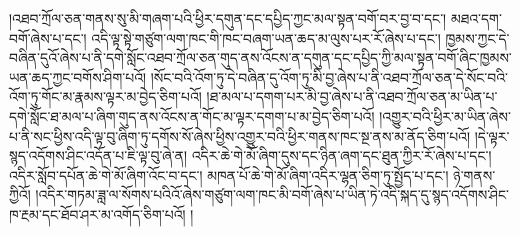 །འཐབ་ཀྲོལ་ཅན་གནས་སུ་མི་གཞག་པའི་ཕྱིར་དགུན་དང་དཔྱིད་ཀྱང་མལ་སྟན་བགོ་བར་བྱ་བ་དང་། མཐའ་དག་བགོ་ཞེས་པ་དང་། འདི་ལྟ་སྟེ་གཙུག་ལག་ཁང་གི་ཁང་བཞག་ཡན་ཆད་མ་ལུས་པར་རོ་ཞེས་པ་དང་། ཁྱམས་ཀྱང་དེ་བཞིན་དུའོ་ཞེས་པ་ནི་དགེ་སློང་འཐབ་ཀྲོལ་ཅན་གུད་ནས་འོངས་ན་དགུན་དང་དཔྱིད་ཀྱི་མལ་སྟན་བགོ་ཞིང་ཁྱམས་ཡན་ཆད་ཀྱང་བགོས་ཤིག་པའོ། །སོང་བའི་འོག་ཏུ་དེ་བཞིན་དུ་འོག་ཏུ་མི་བྱ་ཞེས་པ་ནི་འཐབ་ཀྲོལ་ཅན་དེ་སོང་བའི་འོག་ཏུ་གོང་མ་རྣམས་ལྟར་མ་བྱེད་ཅིག་པའོ། །ཐ་མལ་པ་དགག་པར་མི་བྱ་ཞེས་པ་ནི་འཐབ་ཀྲོལ་ཅན་མ་ཡིན་པ་དགེ་སློང་ཐ་མལ་པ་ཞིག་གུད་ནས་འོངས་ན་གོང་མ་ལྟར་དགག་པ་མ་བྱེད་ཅིག་པའོ། །འགྱུར་བའི་ཕྱིར་མ་ཡིན་ཞེས་པ་ནི་སང་ཕྱིས་འདི་ལྟ་བུ་ཞིག་ཏུ་དགོས་སོ་ཞེས་ཕྱིས་འགྱུར་བའི་ཕྱིར་གནས་ཁང་སྔ་ནས་མ་ནོད་ཅིག་པའོ། །དེ་ལྟར་སྙད་འདོགས་ཤིང་འདོན་པ་ཇི་ལྟ་བུ་ཞེ་ན། འདིར་ཆེ་གེ་མོ་ཞིག་དུས་དང་ཉིན་ཞག་དང་ཐུན་ཀྱིར་རོ་ཞེས་པ་དང་། འདིར་སློབ་དཔོན་ཆེ་གེ་མོ་ཞིག་འོང་བ་དང་། མཁན་པོ་ཆེ་གེ་མོ་ཞིག་འདིར་ལྷན་ཅིག་ཏུ་སྤྱོད་པ་དང་། ཉེ་གནས་ཀྱིའོ། །འདིར་གཏམ་ཟླ་ལ་སོགས་པའིའོ་ཞེས་གཙུག་ལག་ཁང་མི་བགོ་ཞེས་པ་ཡིན་ཏེ་འདི་སྐད་དུ་སྙད་འདོགས་ཤིང་ཁ་རྔམ་དང་ཐོབ་ཤར་མ་འགོད་ཅིག་པའོ། །
